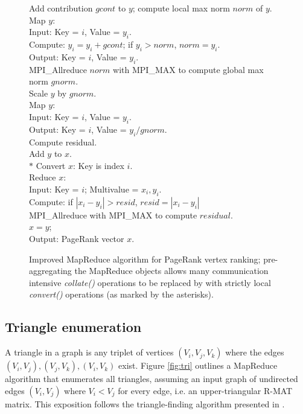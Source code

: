 \begin{figure}[htb]
\begin{center}
{\begin{minipage}{\textwidth}
\begin{tabbing}
\> Add contribution $gcont$ to $y$; compute local max norm $norm$ of $y$. \\
\> \> Map $y$:  \\
\> \> \> Input:  Key = $i$, Value = $y_i$. \\
\> \> \> Compute: $y_i = y_i + gcont$; if $y_i > {norm}$, $norm = y_i$. \\
\> \> \> Output:  Key = $i$, Value = $y_i$. \\
\> \> MPI\_Allreduce $norm$ with MPI\_MAX to compute global max norm $gnorm$. \\
\> Scale $y$ by $gnorm$. \\
\> \> Map $y$: \\
\> \> \> Input:  Key = $i$, Value = $y_i$. \\
\> \> \> Output:  Key = $i$, Value = $y_i / {gnorm}$. \\
\> Compute residual. \\
\> \> Add $y$ to $x$. \\
$*$\> \> Convert $x$:  Key is index $i$. \\
\> \> Reduce $x$:   \\
\> \> \> Input:  Key = $i$; Multivalue = $x_i, y_i$. \\
\> \> \> Compute:  if $|x_i - y_i| > {resid}$, ${resid} = |x_i - y_i|$ \\
\> \> MPI\_Allreduce with MPI\_MAX to compute $residual$. \\
\> $x = y$; \\
Output:  PageRank vector $x$.
  \end{tabbing}
 \end{minipage}}\end{center}

 \caption{Improved MapReduce algorithm for PageRank vertex ranking; pre-aggregating the MapReduce objects allows many communication intensive {\it collate()} 
operations to be replaced by with strictly local {\it convert()} operations (as marked by the asterisks).}

 \label{fig:pr2}
\end{figure}


\subsection{Triangle enumeration}

A triangle in a graph is any triplet of vertices $(V_i,V_j,V_k)$ where
the edges $(V_i,V_j), (V_j,V_k), (V_i,V_k)$ exist.  Figure
\ref{fig:tri} outlines a MapReduce algorithm that enumerates all
triangles, assuming an input graph of undirected edges $(V_i,V_j)$
where $V_i < V_j$ for every edge, i.e. an upper-triangular R-MAT
matrix.  This exposition follows the triangle-finding algorithm
presented in \cite{Cohen}.

